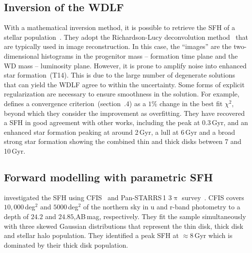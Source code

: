 \documentclass[fleqn,usenatbib]{mnras}
\begin{document}
\subsection{Inversion of the WDLF}
\label{sec:inversion}
With a mathematical inversion method, it is possible to retrieve the SFH of a
stellar population~\citep{2013MNRAS.434.1549R}. They adopt the Richardson-Lucy 
deconvolution method~\citep{1972JOSA...62...55R, 1974AJ.....79..745L} that are typically used in image reconstruction. In this
case, the ``images'' are the two-dimensional histograms in the
progenitor mass -- formation time plane and the WD mass -- luminosity plane. 
However, it is prone to amplify noise into enhanced star 
formation~(T14). This is due to the large number of
degenerate solutions that can yield the WDLF agree to within the uncertainty.
Some forms of explicit regularization are necessary to ensure smoothness in the
solution. For example, \citet{2013MNRAS.434.1549R} defines a convergence
criterion~(section~.4) as a $1\%$ change in the best fit
$\chi^2$, beyond which they consider the improvement as overfitting. They have 
recovered a SFH in good agreement with other works, including the peak at
0.3\,Gyr, and an enhanced star formation peaking at around 2\,Gyr, a lull at
6\,Gyr and a broad strong star formation showing the combined thin and thick
disks between 7 and 10\,Gyr.

\subsection{Forward modelling with parametric SFH}
\citet{2019ApJ...887..148F} investigated the SFH using
CFIS~\citep{2017ApJ...848..128I} and Pan-STARRS\,1 3$\uppi$
survey~\citep{2016arXiv161205560C}. CFIS covers $10,000$\,deg$^2$ and
$5000$\,deg$^2$ of the northern sky in u and r-band photometry to a depth of
$24.2$ and $24.85$,AB\,mag, respectively. They fit the sample simultaneously
with three skewed Gaussian distributions that represent the thin disk, thick
disk and stellar halo population. They identified a peak SFH at $\approx8$\,Gyr
which is dominated by their thick disk population.

\end{document}
